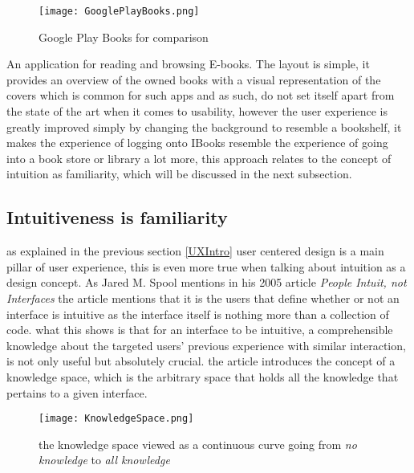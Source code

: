 \begin{figure}[H]
\centering
\texttt{[image: GooglePlayBooks.png]}
\caption{Google Play Books for comparison}
\end{figure}
An application for reading and browsing E-books. The layout is simple, it provides an overview of the owned books with a visual representation of the covers which is common for such apps and as such, do not set itself apart from the state of the art when it comes to usability, however the user experience is greatly improved simply by changing the background to resemble a bookshelf, it makes the experience of logging onto IBooks resemble the experience of going into a book store or library a lot more, this approach relates to the concept of intuition as familiarity, which will be discussed in the next subsection.   



\subsection{Intuitiveness is familiarity}
as explained in the previous section \ref{UXIntro} user centered design is a main pillar of user experience, this is even more true when talking about intuition as a design concept. As Jared M. Spool mentions in his 2005 article \textit{People Intuit, not Interfaces}\cite{JaredMSpool} the article mentions that it is the users that define whether or not an interface is intuitive as the interface itself is nothing more than a collection of code. what this shows is that for an interface to be intuitive, a comprehensible knowledge about the targeted users' previous experience with similar interaction, is not only useful but absolutely crucial. the article introduces the concept of a knowledge space, which is the arbitrary space that holds all the knowledge that pertains to a given interface. 

\begin{figure}[H]
\centering
\texttt{[image: KnowledgeSpace.png]}
\caption{the knowledge space viewed as a continuous curve going from \textit{no knowledge} to \textit{all knowledge} \cite{JaredMSpool}}
\label{fig:Knowledge}
\end{figure}

